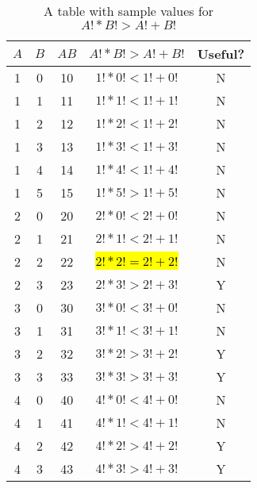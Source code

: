 \begin{table}[ht!]
    \centering
    \begin{tabular}{|| c | c | c | c | c ||}
         \hline
         $A$ & $B$ & $AB$ & $A! * B! > A! + B!$ & Useful?  \\
         \hline
         1 & 0 & 10 & $1! * 0! < 1! + 0!$       & N \\
         1 & 1 & 11 & $1! * 1! < 1! + 1!$       & N  \\
         1 & 2 & 12 & $1! * 2! < 1! + 2!$       & N  \\
         1 & 3 & 13 & $1! * 3! < 1! + 3!$       & N  \\
         1 & 4 & 14 & $1! * 4! < 1! + 4!$       & N  \\
         1 & 5 & 15 & $1! * 5! > 1! + 5!$       & N  \\
         2 & 0 & 20 & $2! * 0! < 2! + 0!$       & N \\
         2 & 1 & 21 & $2! * 1! < 2! + 1!$       & N  \\
         2 & 2 & 22 & \hl{$2! * 2! = 2! + 2!$}  & N  \\
         2 & 3 & 23 & $2! * 3! > 2! + 3!$       & Y  \\
         3 & 0 & 30 & $3! * 0! < 3! + 0!$       & N \\
         3 & 1 & 31 & $3! * 1! < 3! + 1!$       & N  \\
         3 & 2 & 32 & $3! * 2! > 3! + 2!$       & Y  \\
         3 & 3 & 33 & $3! * 3! > 3! + 3!$       & Y  \\
         4 & 0 & 40 & $4! * 0! < 4! + 0!$       & N \\
         4 & 1 & 41 & $4! * 1! < 4! + 1!$       & N  \\
         4 & 2 & 42 & $4! * 2! > 4! + 2!$       & Y  \\
         4 & 3 & 43 & $4! * 3! > 4! + 3!$       & Y  \\
         \hline
    \end{tabular}
    \caption{A table with sample values for $A! * B! > A! + B!$}
\end{table}

